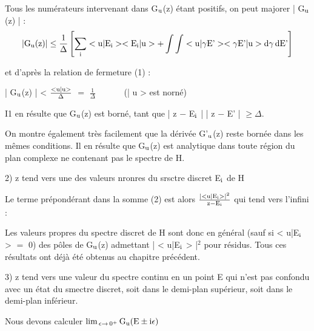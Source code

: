 Tous les numérateurs intervenant dans G$_{\text{u}}$(z) étant positifs, on
peut majorer | G$_{\text{u}}$(z) | :
\[
|\text{G}_{\text{u}}(\text{z})| \leq \frac{1}{\Delta} \left[ \sum_{\text{i}}
< \text{u} | \text{E}_{\text{i}} > < \text{E}_{\text{i}} | \text{u} > +
\int \int < \text{u} | \gamma\text{E'} > < \gamma\text{E'} | \text{u} > \text{d}\gamma \, \text{dE'} \right]
\]

et d'après la relation de fermeture (1) :
\begin{center}
| G$_{\text{u}}$(z) | < $\frac{\text{<u|u>}}{\Delta}$ $=$
$\frac{1}{\Delta}$ \ \ \ \ \ \ (| u > est norné)
\end{center}

I1 en résulte que G$_{\text{u}}$(z) est borné, tant que | z $-$ E$_{\text{i}}$ | | z $-$ E' | $\geq \Delta$.

On montre également très facilement que la dérivée G'$_{\text{u}}$(z) reste bornée dans
les mêmes conditions. Il en résulte que G$_{\text{u}}$(z) est analytique dans toute région
du plan complexe ne contenant pas le spectre de H.

2) z tend vers une des valeurs nronres du srsctre discret E$_{\text{i}}$ de H

Le terme prépondérant dans la somme (2) est alors $\frac{|< \text{u} | \text{E}_{\text{i}} >|^2}{\text{z}-\text{E}_{\text{i}}}$ qui
tend vers l'infini :

Les valeurs propres du spectre discret de H sont donc en général
(sauf si < u|E$_{\text{i}}$ > $=$ 0) des pôles de G$_{\text{u}}$(z) admettant | < u|E$_{\text{i}}$ > |$^2$ pour résidus.
Tous ces résultats ont déjà été obtenus au chapitre précédent.

3) z tend vers une valeur du spectre continu en un point E qui n'est
pas confondu avec un état du smectre discret, soit dans le demi-plan supérieur,
soit dans le demi-plan inférieur.

\begin{center}  \end{center}


Nous devons calculer $\lim_{\,\epsilon \to \,0^+} \text{G}_{\text{u}} (\text{E} \pm \text{i}\epsilon)$

